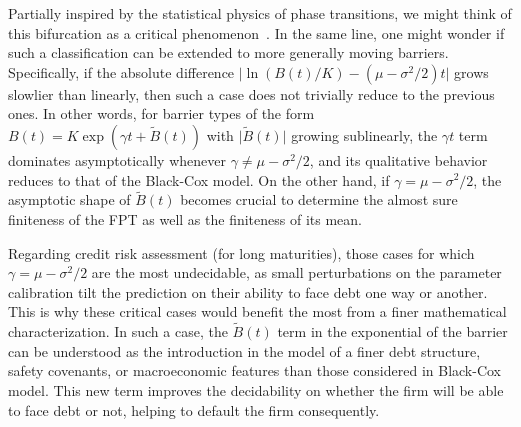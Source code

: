 \documentclass[12pt]{article}
\theoremstyle{definition}
\begin{document}
Partially inspired by the statistical physics of phase transitions, we might think of this bifurcation as a critical phenomenon~\cite{quantum2021zinn}. In the same line, one might wonder if such a classification can be extended to more generally moving barriers.
Specifically, if the absolute difference $\vert\ln(B(t)/K)-(\mu-\sigma^2/2)t\vert$ grows slowlier than linearly, then such a case does not trivially reduce to the previous ones. In other words, for barrier types of the form $B(t)=K\exp(\gamma t+\tilde{B}(t))$ with $\vert\tilde{B}(t)\vert$ growing sublinearly, the $\gamma t$ term dominates asymptotically whenever $\gamma \neq \mu-\sigma^2/2$, and its qualitative behavior reduces to that of the Black-Cox model. On the other hand, if $\gamma=\mu-\sigma^2/2$, the asymptotic shape of $\tilde{B}(t)$ becomes crucial to determine the almost sure finiteness of the FPT as well as the finiteness of its mean.

Regarding credit risk assessment (for long maturities), those cases for which $\gamma=\mu-\sigma^2/2$ are the most undecidable, as small perturbations on the parameter calibration tilt the prediction on their ability to face debt one way or another. This is why these critical cases would benefit the most from a finer mathematical characterization. In such a case, the $\tilde{B}(t)$ term in the exponential of the barrier can be understood as the introduction in the model of a finer debt structure, safety covenants, or macroeconomic features than those considered in Black-Cox model. This new term improves the decidability on whether the firm will be able to face debt or not, helping to default the firm consequently.
\end{document}
